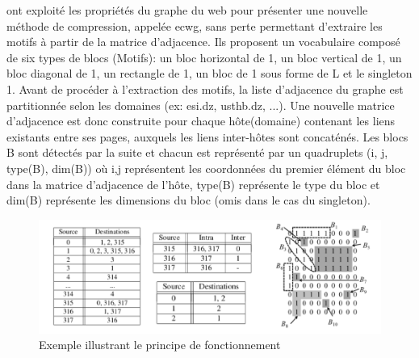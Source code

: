 	\citep{asano2008efficient} ont exploité les propriétés du graphe du web pour présenter une nouvelle méthode de compression, appelée 
	\gls{ecwg}, sans perte permettant d'extraire les motifs à partir de la matrice d'adjacence. Ils proposent un vocabulaire composé de six types de blocs (Motifs): un bloc horizontal de 1, un bloc vertical de 1, un bloc diagonal de 1, un rectangle de 1, un bloc de 1 sous forme de L et le singleton 1. Avant de procéder à l'extraction des motifs, la liste d'adjacence du graphe est partitionnée selon les domaines (ex: esi.dz, usthb.dz, ...). Une nouvelle matrice d'adjacence est donc construite pour chaque hôte(domaine) contenant les liens existants entre ses pages, auxquels les liens inter-hôtes sont concaténés.
					Les blocs B sont détectés par la suite et chacun est représenté par un quadruplets (i, j, type(B), dim(B)) où i,j représentent les coordonnées du premier élément du bloc dans la matrice d'adjacence de l'hôte, type(B) représente le type du bloc et dim(B) représente les dimensions du bloc (omis dans le cas du singleton). 
					\begin{figure}[h]
					\includegraphics[scale=0.5]{ressources/image/inter_intra.png} 
					\caption{Exemple illustrant le principe de fonctionnement \citep{asano2008efficient}}
					\label{interIntra}
				\end{figure}